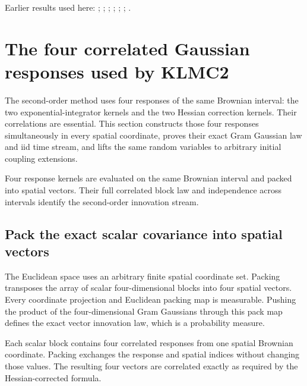 \documentclass[11pt,a4paper]{report}
\begin{document}
Earlier results used here: \cite[Section~3.13.2]{LangevinLean2026ULASC}; \cite[Section~3.17.1]{LangevinLean2026ULASC}; \cite[Section~3.17.2]{LangevinLean2026ULASC}; \cite[Section~3.22.18]{LangevinLean2026ULASC}; \cite[Section~3.22.19]{LangevinLean2026ULASC}; \cite[Section~3.22.2]{LangevinLean2026ULASC}; \cite[Section~3.22.3]{LangevinLean2026ULASC}.
\section{\texorpdfstring{The four correlated Gaussian responses used by KLMC2}{The four correlated Gaussian responses used by KLMC2}}
\label{proof-module-KineticLangevin-CanonicalKLMC2Noise-lean}


The second-order method uses four responses of the same Brownian interval: the two exponential-integrator kernels and the two Hessian correction kernels. Their correlations are essential. This section constructs those four responses simultaneously in every spatial coordinate, proves their exact Gram Gaussian law and iid time stream, and lifts the same random variables to arbitrary initial coupling extensions.



Four response kernels are evaluated on the same Brownian interval and packed into spatial vectors. Their full correlated block law and independence across intervals identify the second-order innovation stream.

\subsection{\texorpdfstring{Pack the exact scalar covariance into spatial vectors}{Pack the exact scalar covariance into spatial vectors}}
\label{report-step-KineticLangevin-CanonicalKLMC2Noise-lean-1}


The Euclidean space uses an arbitrary finite spatial coordinate set. Packing transposes the array of scalar four-dimensional blocks into four spatial vectors. Every coordinate projection and Euclidean packing map is measurable. Pushing the product of the four-dimensional Gram Gaussians through this pack map defines the exact vector innovation law, which is a probability measure.



Each scalar block contains four correlated responses from one spatial Brownian coordinate. Packing exchanges the response and spatial indices without changing those values. The resulting four vectors are correlated exactly as required by the Hessian-corrected formula.
\end{document}
